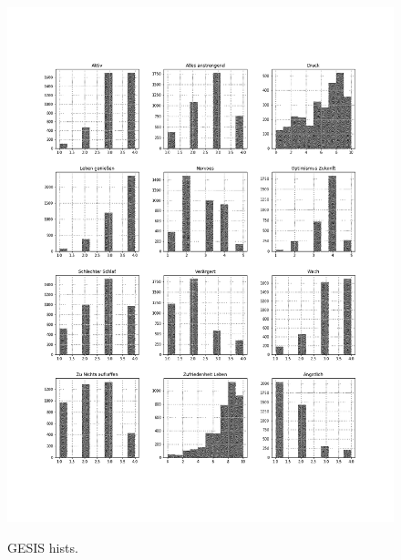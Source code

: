 \begin{figure}[ht]
	\begin{center}
		\includegraphics[scale=0.30,angle=0]{fig/gesis_hist}
		\label{std}
		\caption{GESIS hists.}
	\end{center}
\end{figure}

